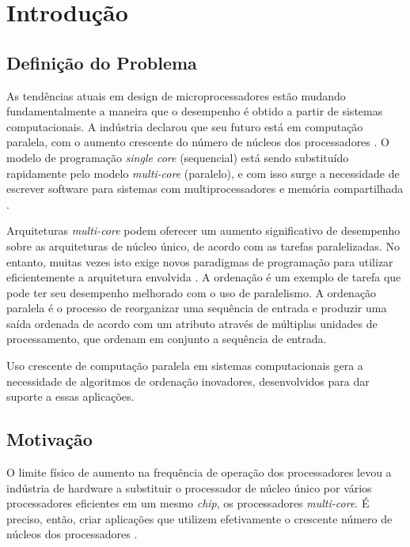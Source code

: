 \chapter{Introdução}

\section{Definição do Problema}

As tendências atuais em design de microprocessadores estão mudando fundamentalmente a maneira que o desempenho é obtido a partir de sistemas computacionais. 
A indústria declarou que seu futuro está em computação paralela, com o aumento crescente do número de núcleos dos processadores \citep{Asanovic:2009}.
O modelo de programação \textit{single core} (sequencial) está sendo substituído rapidamente pelo modelo \textit{multi-core} (paralelo), e com isso surge a necessidade de escrever software para sistemas com multiprocessadores e memória compartilhada \citep{Ernst:2009}.

Arquiteturas \textit{multi-core} podem oferecer um aumento significativo de desempenho sobre as arquiteturas de núcleo único, de acordo com as tarefas paralelizadas. No entanto, muitas vezes isto exige novos paradigmas de programação para utilizar eficientemente a arquitetura envolvida \citep{Prinslow:2011}. A ordenação
é um exemplo de tarefa que pode ter seu desempenho melhorado com o uso de paralelismo. 
A ordenação paralela é o processo de reorganizar uma sequência de entrada e produzir uma saída ordenada de acordo com um atributo através de múltiplas unidades de processamento, que ordenam em conjunto a sequência de entrada. 


Uso crescente de computação paralela em sistemas computacionais gera a necessidade de algoritmos de ordenação inovadores, desenvolvidos para dar suporte a essas aplicações. 

\section{Motivação}

O limite físico de aumento na frequência de operação dos processadores levou a indústria de hardware a substituir o processador de núcleo único por vários processadores eficientes em um mesmo \textit{chip}, os processadores \textit{multi-core}. 
É preciso, então, criar aplicações que utilizem efetivamente o crescente número de núcleos dos processadores  \citep{Asanovic:2009}.

